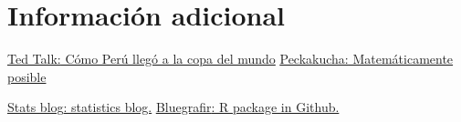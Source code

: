 \documentclass[10pt,a4paper,sans, unicode]{moderncv} %
\begin{document}
\section{Información adicional}
\begin{small}

 {\href{https://www.ted.com/talks/juan_carlos_saravia_por_que_peru_pudo_ir_al_mundial}{\underline{Ted Talk:} Cómo Perú llegó a la copa del mundo}
{\href{https://www.youtube.com/watch?v=kC85LBaDUZo&t=1s}{\underline{Peckakucha:} Matemáticamente posible}}}

 {\href{https://statssos.net}{\underline{Stats blog}: statistics blog.}
{\href{https://github.com/jsaraviadrago/bluegrafir}{\underline{Bluegrafir}: R package in Github.}}}



\end{small}



\end{document}
